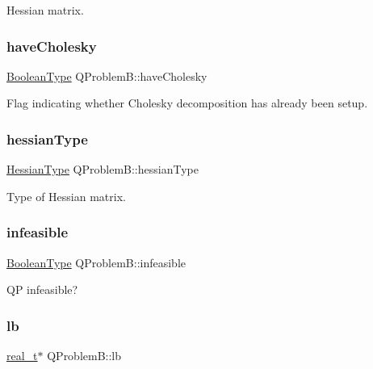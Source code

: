 Hessian matrix. \mbox{\label{class_q_problem_b_a3647c70d0d4fba3f2afe2cca4d289102}} 
\subsubsection{\texorpdfstring{have\+Cholesky}{haveCholesky}}
{\footnotesize\ttfamily \hyperlink{_types_8hpp_a20f82124c82b6f5686a7fce454ef9089}{Boolean\+Type} Q\+Problem\+B\+::have\+Cholesky\hspace{0.3cm}{\ttfamily [protected]}}

Flag indicating whether Cholesky decomposition has already been setup. \mbox{\label{class_q_problem_b_af288e4e7320b9c47c2c95a230cedcbf4}} 
\subsubsection{\texorpdfstring{hessian\+Type}{hessianType}}
{\footnotesize\ttfamily \hyperlink{_types_8hpp_a604cad5cda14e378ce4a77ab28ee9fd9}{Hessian\+Type} Q\+Problem\+B\+::hessian\+Type\hspace{0.3cm}{\ttfamily [protected]}}

Type of Hessian matrix. \mbox{\label{class_q_problem_b_acfeba7662b0bc3050ae37b857e3ea419}} 
\subsubsection{\texorpdfstring{infeasible}{infeasible}}
{\footnotesize\ttfamily \hyperlink{_types_8hpp_a20f82124c82b6f5686a7fce454ef9089}{Boolean\+Type} Q\+Problem\+B\+::infeasible\hspace{0.3cm}{\ttfamily [protected]}}

QP infeasible? \mbox{\label{class_q_problem_b_a424f1b8c4badffef270a68a461671d44}} 
\subsubsection{\texorpdfstring{lb}{lb}}
{\footnotesize\ttfamily \hyperlink{qp_o_a_s_e_s__wrapper_8h_a0d00e2b3dfadee81331bbb39068570c4}{real\+\_\+t}$\ast$ Q\+Problem\+B\+::lb\hspace{0.3cm}{\ttfamily [protected]}}

